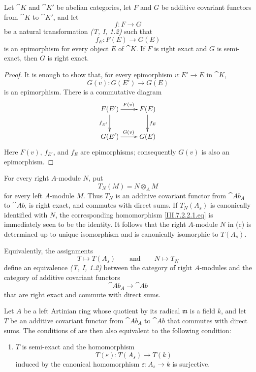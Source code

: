 \begin{lemma}[7.2.5.1]
\label{III.7.2.5.1}
Let $\cat{K}$ and $\cat{K}'$ be abelian categories, let $F$ and
$G$ be additive covariant functors from $\cat{K}$ to
$\cat{K}'$, and let
\[
  f:F\longrightarrow G
\]
be a natural transformation \emph{(T, I, 1.2)} such that
\[
  f_E:F(E)\longrightarrow G(E)
\]
is an epimorphism for every object $E$ of $\cat{K}$.  If $F$ is
right exact and $G$ is semi-exact, then $G$ is right exact.
\end{lemma}

\begin{proof}
It is enough to show that, for every epimorphism
$v:E'\to E$ in $\cat{K}$,
\[
  G(v):G(E')\longrightarrow G(E)
\]
is an epimorphism.  There is a commutative diagram
\[
\xymatrix{
  F(E')\ar[r]^{F(v)}\ar[d]_{f_{E'}}
  & F(E)\ar[d]^{f_E}
  \\
  G(E')\ar[r]^{G(v)}
  & G(E)
}
\]
Here $F(v)$, $f_{E'}$, and $f_E$ are epimorphisms; consequently
$G(v)$ is also an epimorphism.
\end{proof}

\begin{remark}[7.2.6]
\label{III.7.2.6}
For every right $A$-module $N$, put
\[
  T_N(M)=N\otimes_A M
\]
for every left $A$-module $M$.  Thus $T_N$ is an additive
covariant functor from $\cat{Ab}_A$ to $\cat{Ab}$, is right
exact, and commutes with direct sums.  If $T_N(A_s)$ is
canonically identified with $N$, the corresponding homomorphism
\eqref{III.7.2.2.1.eq} is immediately seen to be the identity.
It follows that the right $A$-module $N$ in
(c) is determined up to unique isomorphism and
is canonically isomorphic to $T(A_s)$.

Equivalently, the assignments
\[
  T\longmapsto T(A_s)
  \qquad\text{and}\qquad
  N\longmapsto T_N
\]
define an equivalence \emph{(T, I, 1.2)} between the category
of right $A$-modules and the category of additive covariant
functors
\[
  \cat{Ab}_A\longrightarrow\cat{Ab}
\]
that are right exact and commute with direct sums.
\end{remark}

\begin{proposition}[7.2.7]
\label{III.7.2.7}
Let $A$ be a left Artinian ring whose quotient by its radical
$\mathfrak m$ is a field $k$, and let $T$ be an additive
covariant functor from $\cat{Ab}_A$ to $\cat{Ab}$ that commutes
with direct sums.  The conditions of  are then
also equivalent to the following condition:
\begin{enumerate}
  \item[(d)] $T$ is semi-exact and the homomorphism
    \[
      T(\varepsilon):T(A_s)\longrightarrow T(k)
    \]
    induced by the canonical homomorphism
    $\varepsilon:A_s\to k$ is surjective.
\end{enumerate}
\end{proposition}

